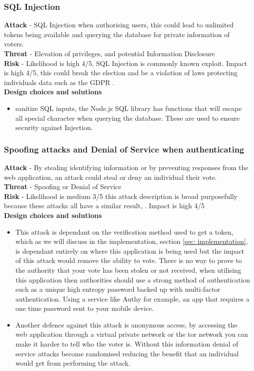 \documentclass{entcs}
\begin{document}
\subsubsection{SQL Injection}
\textbf{Attack} - SQL Injection when authorising users, this could lead to unlimited tokens being available and querying the database for private information of voters. \\
\textbf{Threat} - Elevation of privileges, and potential Information Disclosure \\
\textbf{Risk} - Likelihood is high 4/5, SQL Injection is commonly known exploit. Impact is high 4/5, this could break the election and be a violation of laws protecting individuals data such as the GDPR \cite{GDPR}.\\
\textbf{Design choices and solutions}
\begin{itemize}
    \item sanitize SQL inputs, the Node.js SQL library has functions that will escape all special character when querying the database. These are used to ensure security against Injection.
\end{itemize}

\subsubsection{Spoofing attacks and Denial of Service when authenticating}
\textbf{Attack} -  By stealing identifying information or by preventing responses from the web application, an attack could steal or deny an individual their vote. \\
\textbf{Threat} - Spoofing or Denial of Service\\
\textbf{Risk} - Likelihood is medium 3/5 this attack description is broad purposefully because these attacks all have a similar result, . Impact is high 4/5\\
\textbf{Design choices and solutions}\\
\begin{itemize}
    \item This attack is dependant on the verification method used to get a token, which as we will discuss in the implementation, section \ref{sec: implementation}, is dependant entirely on where this application is being used but the impact of this attack would remove the ability to vote. There is no way to prove to the authority that your vote has been stolen or not received, when utilising this application then authorities should use a strong method of authentication such as a unique high entropy password backed up with multi-factor authentication. Using a service like Authy \cite{Authy} for example, an app that requires a one time password sent to your mobile device.
    \item Another defence against this attack is anonymous access, by accessing the web application through a virtual private network or the tor network you can make it harder to tell who the voter is. Without this information denial of service attacks become randomised reducing the benefit that an individual would get from performing the attack.
\end{itemize}
\end{document}
